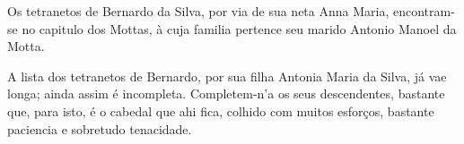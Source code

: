 Os tetranetos de Bernardo da Silva, por via de sua neta Anna Maria, encontram-se no capitulo dos Mottas, à cuja familia pertence seu marido Antonio Manoel da Motta.

A lista dos tetranetos de Bernardo, por sua filha Antonia Maria da Silva, já vae longa; ainda assim é incompleta. Completem-n'a os seus descendentes, bastante que, para isto, é o cabedal que ahi fica, colhido com muitos  esforços, bastante paciencia e sobretudo tenacidade.


